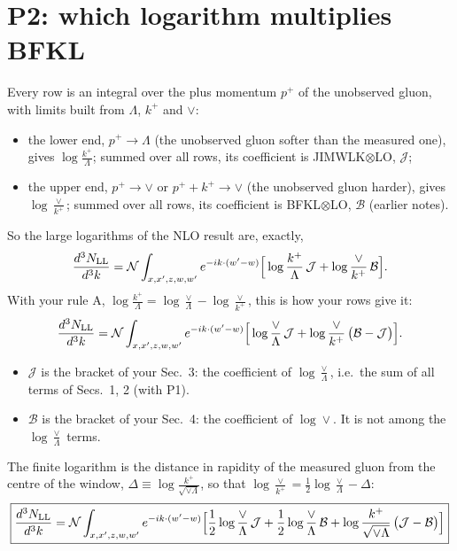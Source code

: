 \documentclass[10pt]{article}
\numberwithin{equation}{section}
\newcommand{\NN}{\mathcal N}
\begin{document}
\section{P2: which logarithm multiplies BFKL}\label{sec:p2}
Every row is an integral over the plus momentum $p^+$ of the unobserved gluon, with limits built from $\Lambda$, $k^+$ and $\vee$:
\begin{itemize}
\item the lower end, $p^+\to\Lambda$ (the unobserved gluon softer than the measured one), gives $\log\frac{k^+}{\Lambda}$; summed over all rows, its coefficient is JIMWLK$\otimes$LO, $\mathcal J$;
\item the upper end, $p^+\to\vee$ or $p^++k^+\to\vee$ (the unobserved gluon harder), gives $\log\frac{\vee}{k^+}$; summed over all rows, its coefficient is BFKL$\otimes$LO, $\mathcal B$ (earlier notes).
\end{itemize}
So the large logarithms of the NLO result are, exactly,
\begin{equation}
\frac{d^3N_{\rm LL}}{d^3k}=\NN\int_{x,x',z,w,w'}e^{-ik\cdot(w'-w)}\Big[\log\frac{k^+}{\Lambda}\,\mathcal J+\log\frac{\vee}{k^+}\,\mathcal B\Big].
\end{equation}
With your rule A, $\log\frac{k^+}{\Lambda}=\log\frac{\vee}{\Lambda}-\log\frac{\vee}{k^+}$, this is how your rows give it:
\begin{equation}
\frac{d^3N_{\rm LL}}{d^3k}=\NN\int_{x,x',z,w,w'}e^{-ik\cdot(w'-w)}\Big[\log\frac{\vee}{\Lambda}\,\mathcal J+\log\frac{\vee}{k^+}\,\big(\mathcal B-\mathcal J\big)\Big].
\end{equation}
\begin{itemize}
\item $\mathcal J$ is the bracket of your Sec.~3: the coefficient of $\log\frac{\vee}{\Lambda}$, i.e.\ the sum of all terms of Secs.~1, 2 (with P1).
\item $\mathcal B$ is the bracket of your Sec.~4: the coefficient of $\log\vee$. It is not among the $\log\frac{\vee}{\Lambda}$ terms.
\end{itemize}
The finite logarithm is the distance in rapidity of the measured gluon from the centre of the window, $\Delta\equiv\log\frac{k^+}{\sqrt{\vee\Lambda}}$, so that $\log\frac{\vee}{k^+}=\frac12\log\frac{\vee}{\Lambda}-\Delta$:
\begin{equation}
\boxed{\frac{d^3N_{\rm LL}}{d^3k}=\NN\int_{x,x',z,w,w'}e^{-ik\cdot(w'-w)}\Big[\frac12\log\frac{\vee}{\Lambda}\,\mathcal J+\frac12\log\frac{\vee}{\Lambda}\,\mathcal B+\log\frac{k^+}{\sqrt{\vee\Lambda}}\,\big(\mathcal J-\mathcal B\big)\Big]}
\label{eq:total}
\end{equation}
\end{document}

